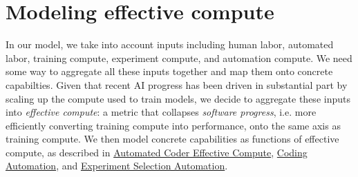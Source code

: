 \documentclass{article}
\theoremstyle{definition}
\newcommand{\ESUG}[1]{\textcolor{purple}{ELI-SUGGESTION: #1}}
\newcommand{\ASUG}[1]{\textcolor{magenta}{ALEX-SUGGESTION: #1}}
\begin{document}

\section{Modeling effective compute} \label{Effective compute}


In our model, we take into account inputs including human labor, automated labor, training compute, experiment compute, and automation compute. We need some way to aggregate all these inputs together and map them onto concrete capabilties. Given that recent AI progress has been driven in substantial part by scaling up the compute used to train models, we decide to aggregate these inputs into \textit{effective compute}: a metric that collapses \textit{software progress}, i.e. more efficiently converting training compute into performance, onto the same axis as training compute. We then model concrete capabilities as functions of effective compute, as described in \hyperref[Automated Coder effective compute]{Automated Coder Effective Compute}, \hyperref[Coding automation]{Coding Automation}, and \hyperref[Experiment selection automation]{Experiment Selection Automation}.
\end{document}
